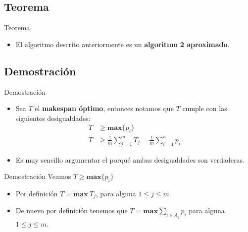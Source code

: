 \renewcommand{\subsectiontitle}{Teorema}
\subsection{\subsectiontitle}

\begin{frame}{\subsectiontitle}
    \begin{itemize}
        \item El algoritmo descrito anteriormente es un \textbf{algoritmo 2 aproximado}.
    \end{itemize}
\end{frame}

\renewcommand{\subsectiontitle}{Demostración}
\subsection{\subsectiontitle}

\begin{frame}{\subsectiontitle}
    \begin{itemize}
        \item Sea \(T\) el \textbf{makespan óptimo}, entonces notamos que \(T\) cumple con las siguientes desigualdades:
        \begin{align*}
            T &\geq \mathbf{max}\{p_{i}\} \\
            T &\geq \frac{1}{m} \sum_{j=1}^{m} T_{j} = \frac{1}{m} \sum_{i=1}^{n} p_{i}
        \end{align*}
        \item Es muy sencillo argumentar el porqué ambas desigualdades son verdaderas.
    \end{itemize}
\end{frame}

\begin{frame}{\subsectiontitle}
    Veamos \(T \geq \mathbf{max}\{p_{i}\}\)
    \begin{itemize}
        \item Por definición \(T = \mathbf{max} \ T_{j}\), para alguna \(1 \leq j \leq m\).
        \item De nuevo por definición tenemos que \(T = \mathbf{max} \displaystyle\sum_{i \in A_{j}} p_{i}\) para alguna \(1 \leq j \leq m\).
    \end{itemize}
\end{frame}

